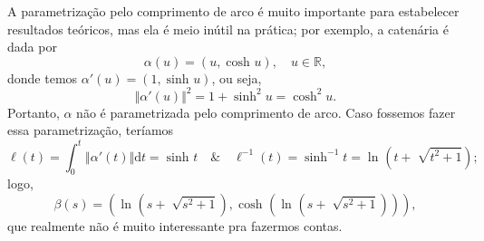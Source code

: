 \documentclass[../differential_geometry.tex]{subfiles}
\begin{document}
\begin{tcolorbox}[
		skin=enhanced,
		title=Observação,
		fonttitle=\bfseries,
		colframe=black,
		colbacktitle=cyan!75!white,
		colback=cyan!15,
		colbacklower=black,
		coltitle=black,
		drop fuzzy shadow,
	]
	A parametrização pelo comprimento de arco é muito importante para estabelecer resultados teóricos, mas ela é meio inútil na prática; por exemplo, a catenária é dada por
	\[
		\alpha (u) = (u, \cosh^{}{u}),\quad u\in \mathbb{R},
	\]
	donde temos \(\alpha '(u) = (1, \sinh^{}{u})\), ou seja,
	\[
		\Vert \alpha '(u) \Vert^{2} = 1 + \sinh^{2}{u} = \cosh^{2}{u}.
	\]
	Portanto, \(\alpha \) não é parametrizada pelo comprimento de arco.
	Caso fossemos fazer essa parametrização, teríamos
	\[
		\ell (t) = \int_{0}^{t}\Vert  \alpha '(t)\Vert \mathrm{d}t = \sinh^{}{t} \quad\&\quad  \ell^{-1}(t) = \sinh^{-1}{t} = \ln^{}{(t+\sqrt[]{t^{2}+1})};
	\]
	logo,
	\[
		\beta (s)=(\ln^{}{(s+\sqrt[]{s^{2}+1})}, \cosh^{}{(\ln^{}{(s+\sqrt[]{s^{2}+1})})}),
	\]
	que realmente não é muito interessante pra fazermos contas.
\end{tcolorbox}
\end{document}
